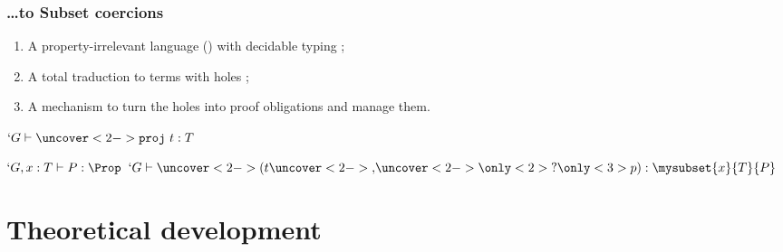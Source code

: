 \begin{frame}[t]
  \frametitle{\ldots to Subset coercions}
  
  \begin{enumerate}
  \item<1-> A property-irrelevant language (\Russell{}) with \alert{decidable} typing ;
  \item<2-> A total traduction to \Coq{} terms with holes ;
  \item<3-> A mechanism to turn the holes into proof obligations and
    manage them.
  \end{enumerate}
  
  \begin{center}
    {$`G \typea \uncover<2->{\texttt{proj}~}t : T$}
    {}\DP

    \vspace{0.5cm}
    {$`G, x : T \type P : \Prop$}
    {}
    {$`G \type \uncover<2->{(}t\uncover<2->{, }\uncover<2->{{\only<2>{?}\only<3>{p}})} : \mysubset{x}{T}{P}$}
    {}\DP
  \end{center}
  

\end{frame}

\section{Theoretical development}

\subsection{\Russell{}}

